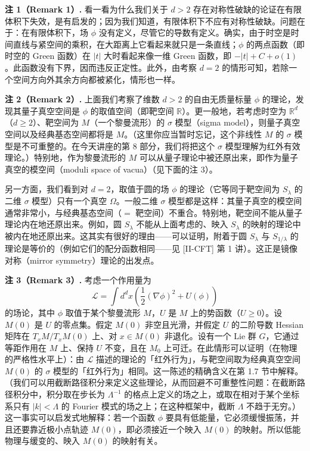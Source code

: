 \textbf{注 1（Remark 1）.} 看一看为什么我们关于 $d>2$ 存在对称性破缺的论证在有限体积下失效，是有启发的；因为我们知道，有限体积下不应有对称性破缺。问题在于：在有限体积下，场 $\phi$ 没有定义，尽管它的导数有定义。确实，由于时空是时间直线与紧空间的乘积，在大距离上它看起来就只是一条直线；$\phi$ 的两点函数（即时空的 Green 函数）在 $|t|$ 大时看起来像一维 Green 函数，即 $-|t|+C+o(1)$。此函数没有下界，因而违反正定性。此外，由考察 $d=2$ 的情形可知，若除一个空间方向外其余方向都被紧化，情形也一样。

\textbf{注 2（Remark 2）.} 上面我们考察了维数 $d>2$ 的自由无质量标量 $\phi$ 的理论，发现其量子真空空间是 $\phi$ 的取值空间（即靶空间 $\mathbb{R}$）。更一般地，若考虑时空为 $\mathbb{R}^d$（$d\ge2$）、靶空间为 $M$（一个黎曼流形）的 $\sigma$ 模型（sigma model），则量子真空空间以及经典基态空间都将是 $M$。（这里你应当暂时忘记，这个非线性 $M$ 的 $\sigma$ 模型是不可重整的。在今天讲座的第 8 部分，我们将把这个 $\sigma$ 模型理解为红外有效理论。）特别地，作为黎曼流形的 $M$ 可以从量子理论中被还原出来，即作为量子真空的模空间（moduli space of vacua）（见下面的注 3）。

另一方面，我们看到对 $d=2$，取值于圆的场 $\phi$ 的理论（它等同于靶空间为 $S_\lambda$ 的二维 $\sigma$ 模型）只有一个真空 $\Omega$。一般二维 $\sigma$ 模型都是这样：其量子真空的模空间通常非常小，与经典基态空间（$=$ 靶空间）不重合。特别地，靶空间不能从量子理论内在地还原出来。例如，圆 $S_\lambda$ 不能从上面考虑的、映入 $S_\lambda$ 的映射的理论中被内在地还原出来。这其实有很好的理由——可以证明，附着于圆 $S_\lambda$ 与 $S_{1/\lambda}$ 的理论是等价的（例如它们的配分函数相同——见 [II-CFT] 第 1 讲）。这正是镜像对称（mirror symmetry）理论的出发点。

\textbf{注 3（Remark 3）.} 考虑一个作用量为
\[
\mathcal{L}=\int d^dx\left(\frac12(\nabla\phi)^2+U(\phi)\right)
\]
的场论，其中 $\phi$ 取值于某个黎曼流形 $M$，$U$ 是 $M$ 上的势函数（$U\ge0$）。设 $M(0)$ 是 $U$ 的零点集。假定 $M(0)$ 非空且光滑，并假定 $U$ 的二阶导数 Hessian 矩阵在 $T_xM/T_xM(0)$ 上、对 $x\in M(0)$ 非退化。设有一个 Lie 群 $G$，它通过等距作用在 $M$ 上、保持 $U$ 不变，且在 $M_0$ 上可迁。在此情形可以证明（在物理的严格性水平上）：由 $\mathcal{L}$ 描述的理论的「红外行为」，与靶空间取为经典真空空间 $M(0)$ 的 $\sigma$ 模型的「红外行为」相同。这一陈述的精确含义在第 1.7 节中解释。（我们可以用截断路径积分来定义这些理论，从而回避不可重整性问题：在截断路径积分中，积分取在步长为 $\Lambda^{-1}$ 的格点上定义的场之上，或取在相对于某个坐标系只有 $|k|<\Lambda$ 的 Fourier 模式的场之上；在这种框架中，截断 $\Lambda$ 不趋于无穷。）这一事实可以启发式地解释：若一个函数 $\phi$ 要具有低能量，它必须缓慢振荡，并且还要靠近极小点轨迹 $M(0)$，即必须接近一个映入 $M(0)$ 的映射。所以低能物理与缓变的、映入 $M(0)$ 的映射有关。

